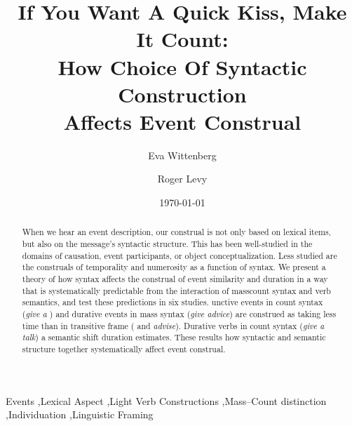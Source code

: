 \documentclass[preprint,12pt,authoryear]{elsarticle}
\date{\today}
\begin{document}
\begin{frontmatter}

\title{If You Want A Quick Kiss, Make It Count:\\
How Choice Of Syntactic Construction \\Affects Event Construal}

\author[ucsd]{Eva Wittenberg}
\author[ucsd,mit]{Roger Levy}

\address[ucsd]{Department of Linguistics\\University of California, San Diego\\9500 Gilman Drive\\La Jolla, CA 92093-0108}
\address[mit]{Department of Brain and Cognitive Sciences\\
Massachusetts Institute of Technology\\
77 Massachusetts Avenue\\
Cambridge, MA 02139-4307}


\begin{abstract}
When we hear an event description, our  construal is not only based on lexical items, but also on the message's syntactic structure. This has been well-studied in the domains of causation, event participants, or object conceptualization. Less studied are the construals of temporality and numerosity as a function of syntax. We present a theory of how  syntax  affects the construal of event similarity and duration in a way that is systematically predictable from the interaction of masscount syntax and verb semantics, and test these predictions in six studies. unctive events in count syntax{ (\emph{give a })} and durative events in mass syntax{ (\emph{give advice})} are construed as taking less time than in transitive frame{ (\emph{} and \emph{advise})}. Durative verbs in count syntax (\emph{give a talk}) a semantic shift duration estimates. These results how syntactic and semantic structure together systematically affect event construal.
\end{abstract}

\begin{keyword}
Events \sep Lexical Aspect \sep Light Verb Constructions \sep Mass--Count distinction \sep Individuation \sep Linguistic Framing
\end{keyword}

\end{frontmatter}
\end{document}
